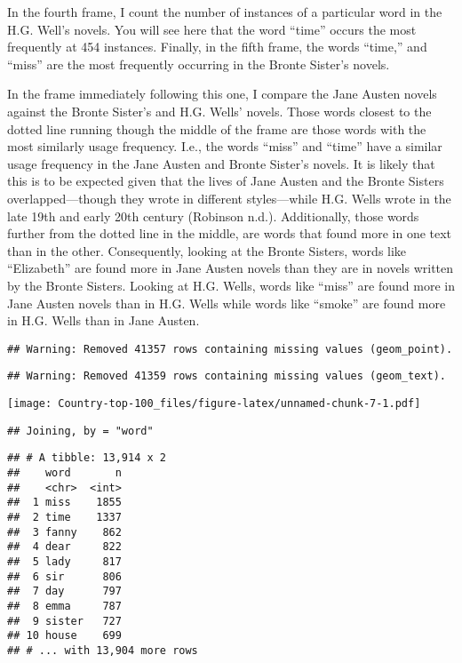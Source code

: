 \documentclass[]{article}
\begin{document}
In the fourth frame, I count the number of instances of a particular
word in the H.G. Well's novels. You will see here that the word ``time''
occurs the most frequently at 454 instances. Finally, in the fifth
frame, the words ``time,'' and ``miss'' are the most frequently
occurring in the Bronte Sister's novels.

In the frame immediately following this one, I compare the Jane Austen
novels against the Bronte Sister's and H.G. Wells' novels. Those words
closest to the dotted line running though the middle of the frame are
those words with the most similarly usage frequency. I.e., the words
``miss'' and ``time'' have a similar usage frequency in the Jane Austen
and Bronte Sister's novels. It is likely that this is to be expected
given that the lives of Jane Austen and the Bronte Sisters
overlapped---though they wrote in different styles---while H.G. Wells
wrote in the late 19th and early 20th century (Robinson n.d.).
Additionally, those words further from the dotted line in the middle,
are words that found more in one text than in the other. Consequently,
looking at the Bronte Sisters, words like ``Elizabeth'' are found more
in Jane Austen novels than they are in novels written by the Bronte
Sisters. Looking at H.G. Wells, words like ``miss'' are found more in
Jane Austen novels than in H.G. Wells while words like ``smoke'' are
found more in H.G. Wells than in Jane Austen.

\begin{verbatim}
## Warning: Removed 41357 rows containing missing values (geom_point).
\end{verbatim}

\begin{verbatim}
## Warning: Removed 41359 rows containing missing values (geom_text).
\end{verbatim}

\texttt{[image: Country-top-100\_files/figure-latex/unnamed-chunk-7-1.pdf]}

\begin{verbatim}
## Joining, by = "word"
\end{verbatim}

\begin{verbatim}
## # A tibble: 13,914 x 2
##    word       n
##    <chr>  <int>
##  1 miss    1855
##  2 time    1337
##  3 fanny    862
##  4 dear     822
##  5 lady     817
##  6 sir      806
##  7 day      797
##  8 emma     787
##  9 sister   727
## 10 house    699
## # ... with 13,904 more rows
\end{verbatim}
\end{document}
